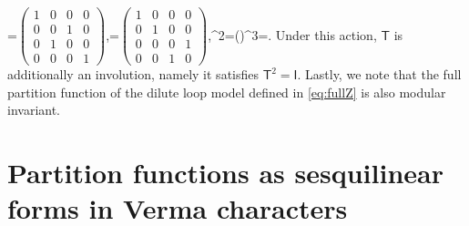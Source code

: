 \documentclass[11pt]{article}
\numberwithin{equation}{section}
\theoremstyle{definition}
\numberwithin{equation}{section}
\begin{document}
\be
{}=\mbox{\scriptsize $\begin{pmatrix} 1&0&0&0\\  0&0&1&0\\  0&1&0&0\\  0&0&0&1\end{pmatrix}$},\quad {}=\mbox{\scriptsize $\begin{pmatrix} 1&0&0&0\\  0&1&0&0\\  0&0&0&1\\  0&0&1&0\end{pmatrix}$},\qquad {}^2=()^3=.
\ee
Under this action, $\mathsf{T}$ is additionally an involution, namely it satisfies $\mathsf{T}^2=\mathsf{I}$. 
Lastly, we note that the full partition function of the dilute loop model defined in \eqref{eq:fullZ} is also modular invariant.

%
\section{Partition functions as sesquilinear forms in Verma characters}\label{sec:Verma}
%
\end{document}
